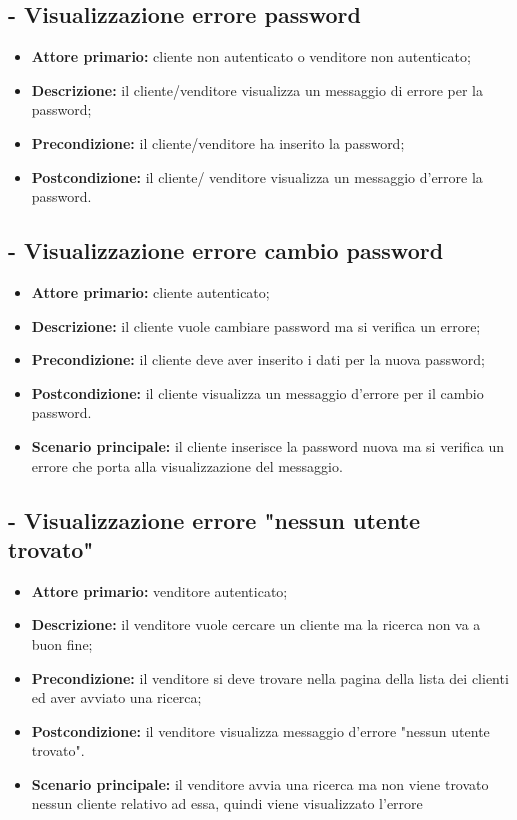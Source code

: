 \stepUserCase
\subsection{ - Visualizzazione errore password}
\begin{itemize}
    \item \textbf{Attore primario:} cliente non autenticato o venditore non autenticato;
    \item \textbf{Descrizione:} il cliente/venditore visualizza un messaggio di errore per la password;
    \item \textbf{Precondizione:} il cliente/venditore ha inserito la password;
    \item \textbf{Postcondizione:} il cliente/ venditore visualizza un messaggio d'errore la password. 
\end{itemize}

\stepUserCase
\subsection{ - Visualizzazione errore cambio password}
\begin{itemize}
    \item \textbf{Attore primario:} cliente autenticato;
    \item \textbf{Descrizione:} il cliente vuole cambiare password ma si verifica un errore;
    \item \textbf{Precondizione:} il cliente deve aver inserito i dati per la nuova password;
    \item \textbf{Postcondizione:} il cliente visualizza un messaggio d'errore per il cambio password.
    \item \textbf{Scenario principale:} il cliente inserisce la password nuova ma si verifica un errore che porta alla visualizzazione del messaggio.
\end{itemize}

\stepUserCase
\subsection{ - Visualizzazione errore "nessun utente trovato"}
\begin{itemize}
    \item \textbf{Attore primario:} venditore autenticato;
    \item \textbf{Descrizione:} il venditore vuole cercare un cliente ma la ricerca non va a buon fine;
    \item \textbf{Precondizione:} il venditore si deve trovare nella pagina della lista dei clienti ed aver avviato una ricerca;
    \item \textbf{Postcondizione:} il venditore visualizza messaggio d'errore "nessun utente trovato".
    \item \textbf{Scenario principale:} il venditore avvia una ricerca ma non viene trovato nessun cliente relativo ad essa, quindi viene visualizzato l'errore
\end{itemize}


